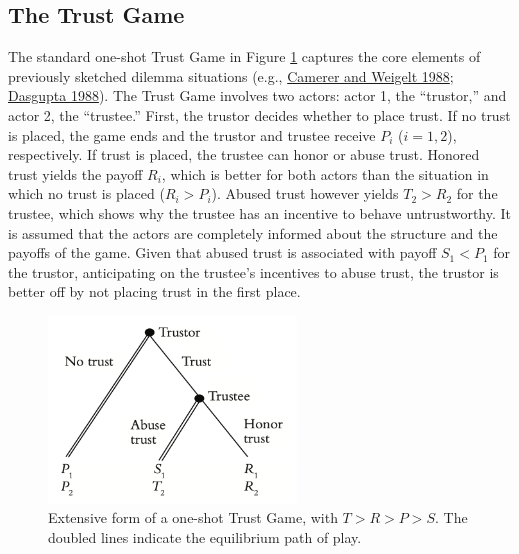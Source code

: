 \documentclass[
  11pt,
]{article}
\begin{document}
\hypertarget{the-trust-game}{%
\subsection{The Trust Game}\label{the-trust-game}}

The standard one-shot Trust Game in Figure \ref{fig:TG-graph} captures the core elements of previously sketched dilemma situations (e.g., \protect\hyperlink{ref-camerer_weigelt_sequential_1988}{Camerer and Weigelt 1988}; \protect\hyperlink{ref-dasgupta_1988}{Dasgupta 1988}).
The Trust Game involves two actors: actor 1, the ``trustor,'' and actor 2, the ``trustee.''
First, the trustor decides whether to place trust.
If no trust is placed, the game ends and the trustor and trustee receive \(P_i\) (\(i = 1,2\)), respectively.
If trust is placed, the trustee can honor or abuse trust.
Honored trust yields the payoff \(R_i\), which is better for both actors than the situation in which no trust is placed (\(R_i > P_i\)).
Abused trust however yields \(T_2 > R_2\) for the trustee, which shows why the trustee has an incentive to behave untrustworthy.
It is assumed that the actors are completely informed about the structure and the payoffs of the game.
Given that abused trust is associated with payoff \(S_{1} < P_{1} %
\) for the trustor, anticipating on the trustee's incentives to abuse trust, the trustor is better off by not placing trust in the first place.

\begin{figure}[t]

{\centering \includegraphics[width=2.59in]{TG} 

}

\caption{Extensive form of a one-shot Trust Game, with $T > R > P > S$. The doubled lines indicate the equilibrium path of play.}\label{fig:TG-graph}
\end{figure}
\end{document}
